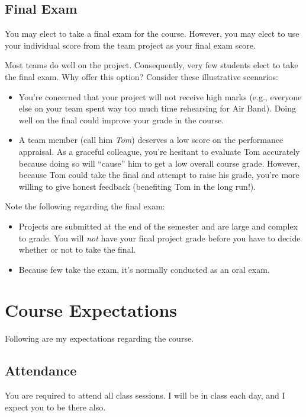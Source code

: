 \documentclass[11pt]{article}
\begin{document}
\subsection{Final Exam}

You may elect to take a final exam for the course.
However, you may elect to use your individual score from the team
project as your final exam score.

Most teams do well on the project.
Consequently, very few students elect to take the final exam.
Why offer this option? Consider these illustrative scenarios:
\begin{itemize}
\item You're concerned that your project will not receive high marks
  (e.g., everyone else on your team spent way too much time rehearsing for Air Band).
  Doing well on the final could improve your grade in the course.
\item A team member (call him \emph{Tom}) deserves a low score on the performance appraisal.
  As a graceful colleague, you're hesitant to evaluate Tom accurately
  because doing so will ``cause'' him to get a low overall course grade.
  However, because Tom could take the final and attempt to raise his grade,
  you're more willing to give honest feedback (benefiting Tom in the long run!).
\end{itemize}

Note the following regarding the final exam:
\begin{itemize}
\item Projects are submitted at the end of the semester
  and are large and complex to grade.
  You will \emph{not} have your final project grade
  before you have to decide whether or not to take the final.
\item Because few take the exam, it's normally conducted as an oral exam.
\end{itemize}

\section{Course Expectations}

Following are my expectations regarding the course.

\subsection{Attendance}
\label{sec:attendance}

You are required to attend all class sessions.
I will be in class each day, and I expect you to be there also.
\end{document}
